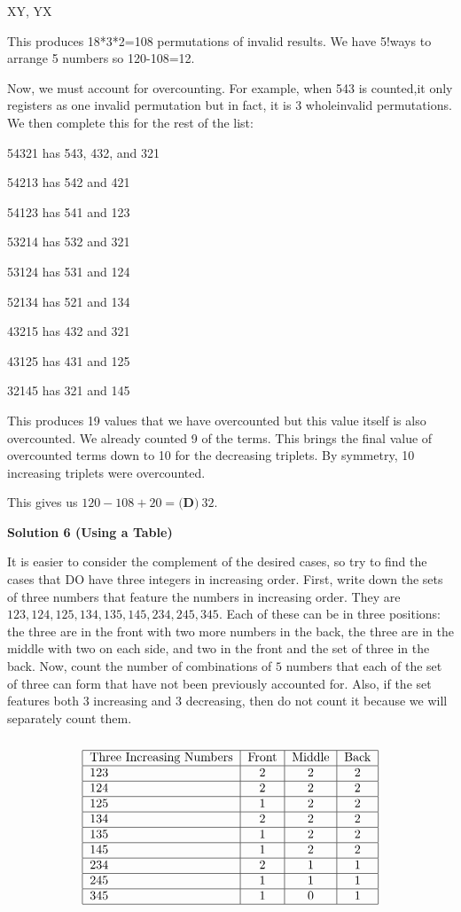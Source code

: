 \begin{enumerate}
 XY, YX

 This produces 18*3*2=108 permutations of invalid results. We have 5!ways to arrange 5 numbers so 120-108=12.

 Now, we must account for overcounting. For example, when 543 is counted,it only registers as one invalid permutation but in fact, it is 3 wholeinvalid permutations. We then complete this for the rest of the list:

 54321 has 543, 432, and 321

 54213 has 542 and 421

 54123 has 541 and 123

 53214 has 532 and 321

 53124 has 531 and 124

 52134 has 521 and 134

 43215 has 432 and 321

 43125 has 431 and 125

 32145 has 321 and 145

 This produces 19 values that we have overcounted but this value itself is also overcounted. We already counted 9 of the terms. This brings the final value of overcounted terms down to 10 for the decreasing triplets. By symmetry, 10 increasing triplets were overcounted.

 This gives us $120-108+20=\boxed{\textbf{(D)} ~32}.$




\textbf{Solution 6 (Using a Table)}

It is easier to consider the complement of the desired cases, so try to find the cases that DO have three integers in increasing order. First, write down the sets of three numbers that feature the numbers in increasing order. They are $123, 124, 125, 134, 135, 145, 234, 245, 345$. Each of these can be in three positions: the three are in the front with two more numbers in the back, the three are in the middle with two on each side, and two in the front and the set of three in the back. Now, count the number of combinations of $5$ numbers that each of the set of three can form that have not been previously accounted for. Also, if the set features both $3$ increasing and $3$ decreasing, then do not count it because we will separately count them. 

 
 \[\begin{tabular}[t]{|l|c|c|c|} \hline Three Increasing Numbers&Front&Middle&Back\\\hline 123&2&2&2\\\hline 124&2&2&2\\\hline 125&1&2&2\\\hline 134&2&2&2\\\hline 135&1&2&2\\\hline 145&1&2&2\\\hline 234&2&1&1\\\hline 245&1&1&1\\\hline 345&1&0&1\\\hline \end{tabular}\]


\end{enumerate}

